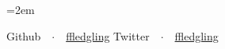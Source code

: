 \documentclass{scrartcl}
\newcommand{\MarginText}[1]{\marginpar{\raggedleft\itshape\small#1}} %
\newcommand{\Description}[1]{\hangindent=2em\hangafter=0\noindent\raggedright\footnotesize{#1}\par\normalsize\vspace{1em}} %
\begin{document}
\begin{cv}{}
\vspace{1em} %



\vspace{0.5em}

\Description{\MarginText{}Github\ \ $\cdotp$\ \ \href{https://github.com/ffledgling}{ffledgling}\linebreak
Twitter\ \ $\cdotp$\ \ \href{https://twitter.com/ffledgling}{ffledgling}}


\end{cv}
\end{document}
